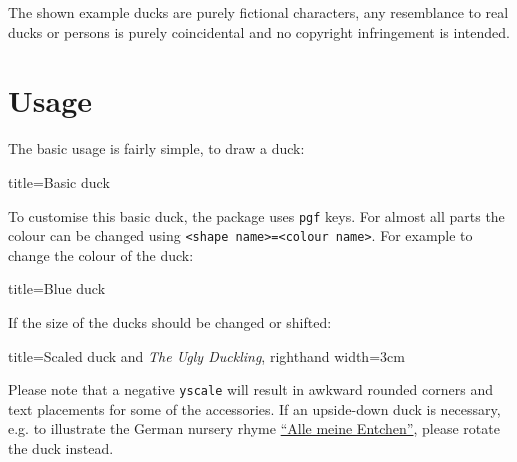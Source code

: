 \documentclass[parskip=half]{scrartcl}
\begin{document}
The shown example ducks are purely fictional characters, any resemblance to real ducks or persons is purely coincidental and no copyright infringement is intended.

\section{Usage}

The basic usage is fairly simple, to draw a duck:
\begin{tcblisting}{title={Basic duck}}
\begin{tikzpicture}
	\duck
\end{tikzpicture}
\end{tcblisting}

To customise this basic duck, the package uses \lstinline|pgf| keys. For almost all parts the colour can be changed using \lstinline|<shape name>=<colour name>|. For example to change the colour of the duck:
\begin{tcblisting}{title={Blue duck}}
\begin{tikzpicture}
	\duck[body=blue]
\end{tikzpicture}
\end{tcblisting}

\clearpage
If the size of the ducks should be changed or shifted:

\begin{tcblisting}{title={Scaled duck and \emph{The Ugly Duckling}},	righthand width=3cm}
\begin{tikzpicture}[scale=0.6]
	\duck
	\begin{scope}[xshift=90pt, scale=.3, yshift=150pt]
		\duck
	\end{scope}
	\begin{scope}[xshift=60pt, scale=.3, yshift=100pt]
		\duck
	\end{scope}
	\begin{scope}[xshift=80pt, scale=.3, yshift=50pt]
		\duck[body=gray!50!white,head=gray!50!white]
	\end{scope}		
\end{tikzpicture}
\end{tcblisting}

Please note that a negative \lstinline|yscale| will result in awkward rounded corners and text placements for some of the accessories. If an upside-down duck is necessary, e.g. to illustrate the German nursery rhyme  \href{https://de.wikipedia.org/wiki/Alle_meine_Entchen}{``Alle meine Entchen''}, please rotate the duck instead.
\end{document}

